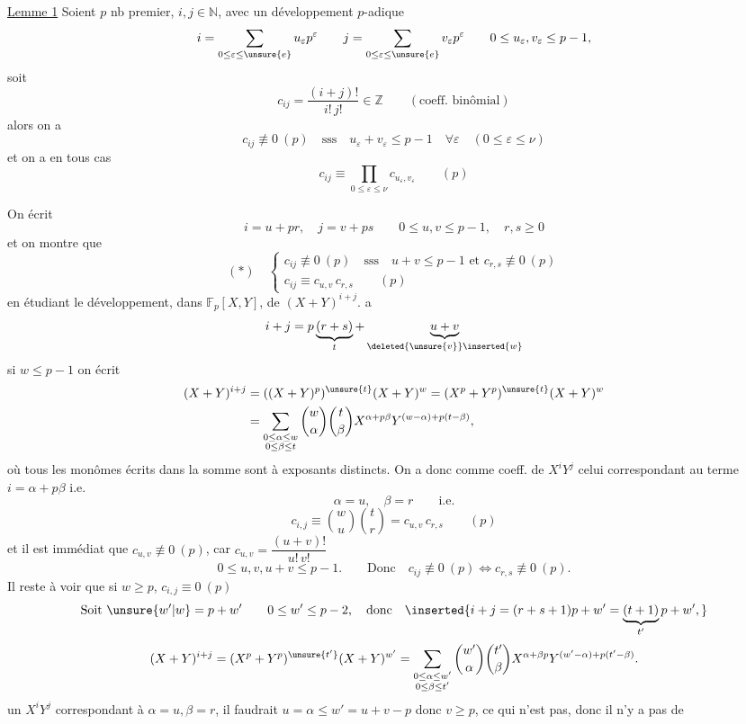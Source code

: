 

\uline{Lemme 1} Soient $p$ nb premier, $i,j\in\mathbb N$, avec un développement $p$-adique
\[
i=\sum_{0\leq\varepsilon\leq\unsure{e}}u_\varepsilon p^\varepsilon\qquad
j=\sum_{0\leq\varepsilon\leq\unsure{e}}v_\varepsilon p^\varepsilon\qquad
0\leq u_\varepsilon,v_\varepsilon\leq p-1,
\]
soit
\[
c_{ij}=\frac{(i+j)!}{i!\,j!}\in\mathbb Z\qquad(\text{coeff. binômial})
\]
alors on a
\[
c_{ij}\not\equiv0\ (p)\quad\text{sss}\quad u_\varepsilon+v_\varepsilon\leq p-1\quad\forall\varepsilon\quad(0\leq\varepsilon\leq\nu)
\]
et  on a en tous cas
\[
c_{ij}\equiv\prod_{0\leq\varepsilon\leq\nu}c_{u_\varepsilon,v_\varepsilon}\qquad(p)
\]

On écrit 
\[
i=u+pr,\quad j=v+ps\qquad0\leq u,v\leq p-1,\quad r,s\geq0
\]
et on montre que
\[
(*)\quad\begin{cases}
c_{ij}\not\equiv0\ (p)\quad\text{sss}\quad u+v\leq p-1\text{ et }c_{r,s}\not\equiv0\ (p)\\
c_{ij}\equiv c_{u,v}\,c_{r,s}\qquad(p)
\end{cases}
\]
en étudiant le développement, dans $\mathbb F_p[X,Y]$, de $(X+Y)^{i+j}$.  a
\[
i+j=p\underbrace{(r+s)}_t+\underbrace{u+v}_{\deleted{\unsure{v}}\inserted{w}}
\]
si $w\leq p-1$ on écrit
\[
\begin{aligned}
(X+Y)^{i+j}&=((X+Y)^p)^{\unsure{t}}(X+Y)^w=(X^p+Y^p)^{\unsure{t}}(X+Y)^w\\
&=\sum_{\substack{0\leq\alpha\leq w\\0\leq\beta\leq t}}\binom{w}{\alpha}\binom{t}{\beta}X^{\alpha+p\beta}Y^{(w-\alpha)+p(t-\beta)},
\end{aligned}
\]
où tous les monômes écrits dans la somme sont à exposants distincts. On a donc comme coeff. de $X^iY^j$ celui correspondant au terme $i=\alpha+p\beta$ i.e.
\[
\alpha=u,\quad\beta=r\qquad\text{i.e.}
\]
\[
c_{i,j}\equiv\binom{w}{u}\binom{t}{r}=c_{u,v}\,c_{r,s}\qquad(p)
\]
et il est immédiat que $c_{u,v}\not\equiv0\ (p)$, car $c_{u,v}=\dfrac{(u+v)!}{u!\,v!}$
\[
0\leq u,v,u+v\leq p-1.\qquad\text{Donc}\quad c_{ij}\not\equiv0\ (p)\Longleftrightarrow c_{r,s}\not\equiv0\ (p).
\]
Il reste à voir que si $w\geq p$,   $c_{i,j}\equiv0\ (p)$
\[
\text{Soit }\unsure{w'|w}=p+w'\qquad0\leq w'\leq p-2,\quad\text{donc}\quad
\inserted{i+j=(r+s+1)p+w'=\underbrace{(t+1)}_{t'}p+w',}
\]
\[
(X+Y)^{i+j}=(X^p+Y^p)^{\unsure{t'}}(X+Y)^{w'}
=\sum_{\substack{0\leq\alpha\leq w'\\0\leq\beta\leq t'}}\binom{w'}{\alpha}\binom{t'}{\beta}X^{\alpha+\beta p}Y^{(w'-\alpha)+p(t'-\beta)}.
\]
 un $X^iY^j$ correspondant à $\alpha=u,\beta=r$, il faudrait $u=\alpha\leq w'=u+v-p$ donc $v\geq p$, ce qui n'est pas, donc il n'y a pas de

